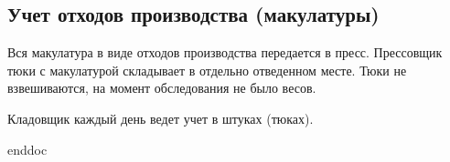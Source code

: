 \subsection{Учет отходов производства (макулатуры)}

 

Вся макулатура в виде отходов производства передается в пресс. Прессовщик тюки с  макулатурой складывает в отдельно отведенном месте. Тюки не взвешиваются, на момент обследования не было весов. 

Кладовщик каждый день ведет учет в штуках (тюках).








\clearpage
 {enddoc}